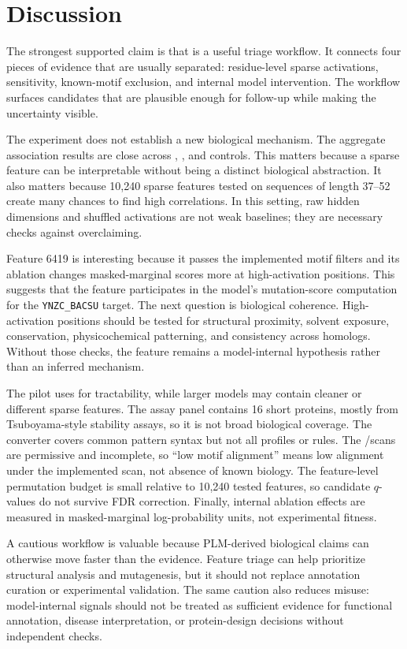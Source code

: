 \section{Discussion}
\label{sec:discussion}

 The strongest supported claim is that \methodname is a useful triage workflow. It connects four pieces of evidence that are usually separated: residue-level sparse activations, \dms sensitivity, known-motif exclusion, and internal model intervention. The workflow surfaces candidates that are plausible enough for follow-up while making the uncertainty visible.

 The experiment does not establish a new biological mechanism. The aggregate association results are close across \sae, \rawhidden, and \shuffledsae controls. This matters because a sparse feature can be interpretable without being a distinct biological abstraction. It also matters because 10,240 sparse features tested on sequences of length 37--52 create many chances to find high correlations. In this setting, raw hidden dimensions and shuffled activations are not weak baselines; they are necessary checks against overclaiming.

 Feature 6419 is interesting because it passes the implemented motif filters and its ablation changes \esm masked-marginal scores more at high-activation positions. This suggests that the feature participates in the model's mutation-score computation for the \texttt{YNZC\_BACSU} target. The next question is biological coherence. High-activation positions should be tested for structural proximity, solvent exposure, conservation, physicochemical patterning, and consistency across homologs. Without those checks, the feature remains a model-internal hypothesis rather than an inferred mechanism.

 The pilot uses \esmeight for tractability, while larger \esm models may contain cleaner or different sparse features. The assay panel contains 16 short proteins, mostly from Tsuboyama-style stability assays, so it is not broad biological coverage. The \prosite converter covers common pattern syntax but not all profiles or rules. The \elm/\prosite scans are permissive and incomplete, so ``low motif alignment'' means low alignment under the implemented scan, not absence of known biology. The feature-level permutation budget is small relative to 10,240 tested features, so candidate $q$-values do not survive FDR correction. Finally, internal ablation effects are measured in masked-marginal log-probability units, not experimental fitness.

 A cautious workflow is valuable because PLM-derived biological claims can otherwise move faster than the evidence. Feature triage can help prioritize structural analysis and mutagenesis, but it should not replace annotation curation or experimental validation. The same caution also reduces misuse: model-internal signals should not be treated as sufficient evidence for functional annotation, disease interpretation, or protein-design decisions without independent checks.

